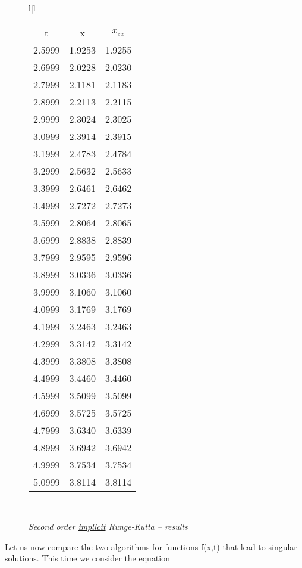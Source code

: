 \begin{figure}
\begin{tabular}{l|l}
\begin{tabular}{ccc}
            \multicolumn{1}{c}{t} &  \multicolumn{1}{c}{x}  & \multicolumn{1}{c}{$x_{ex}$}\\
            2.5999 & 1.9253 & 1.9255 \\
            2.6999 & 2.0228 & 2.0230 \\
            2.7999 & 2.1181 & 2.1183 \\
            2.8999 & 2.2113 & 2.2115 \\
            2.9999 & 2.3024 & 2.3025 \\
            3.0999 & 2.3914 & 2.3915 \\
            3.1999 & 2.4783 & 2.4784 \\
            3.2999 & 2.5632 & 2.5633 \\
            3.3999 & 2.6461 & 2.6462 \\
            3.4999 & 2.7272 & 2.7273 \\
            3.5999 & 2.8064 & 2.8065 \\
            3.6999 & 2.8838 & 2.8839 \\
            3.7999 & 2.9595 & 2.9596 \\
            3.8999 & 3.0336 & 3.0336 \\
            3.9999 & 3.1060 & 3.1060 \\
            4.0999 & 3.1769 & 3.1769 \\
            4.1999 & 3.2463 & 3.2463 \\
            4.2999 & 3.3142 & 3.3142 \\
            4.3999 & 3.3808 & 3.3808 \\
            4.4999 & 3.4460 & 3.4460 \\
            4.5999 & 3.5099 & 3.5099 \\
            4.6999 & 3.5725 & 3.5725 \\
            4.7999 & 3.6340 & 3.6339 \\
            4.8999 & 3.6942 & 3.6942 \\
            4.9999 & 3.7534 & 3.7534 \\
            5.0999 & 3.8114 & 3.8114 \\
        \end{tabular}
        \\
    \end{tabular}
    \caption{\textit{Second order \underline{implicit} Runge-Kutta -- results}}
    \label{fig:06_11}
\end{figure}

Let us now compare the two algorithms for functions f(x,t) that lead to singular solutions. This time we consider the equation

